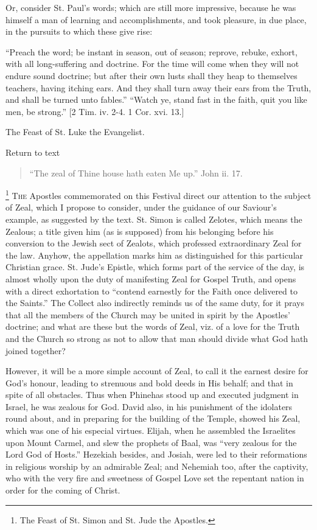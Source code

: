 Or, consider St. Paul's words; which are still more impressive,
because he was himself a man of learning and accomplishments, and took
pleasure, in due place, in the pursuits to which these give rise:

``Preach the word; be instant in season, out of season; reprove,
rebuke, exhort, with all long-suffering and doctrine. For the time will
come when they will not endure sound doctrine; but after their own lusts
shall they heap to themselves teachers, having itching ears. And they
shall turn away their ears from the Truth, and shall be turned unto
fables.'' ``Watch ye, stand fast in the faith, quit you like
men, be strong.'' [2 Tim. iv. 2-4. 1 Cor. xvi. 13.]


The Feast of St. Luke the Evangelist.

Return to text


\begin{quote}

``The zeal of Thine house hath eaten Me up.'' John ii. 17.

\end{quote}

\footnote{The Feast of St. Simon and St. Jude the Apostles.} T\textsc{he} Apostles
commemorated on this Festival direct our attention to the subject of
Zeal, which I propose to consider, under the guidance of our Saviour's
example, as suggested by the text. St. Simon is called Zelotes, which
means the Zealous; a title given him (as is supposed) from his belonging
before his conversion to the Jewish sect of Zealots, which professed
extraordinary Zeal for the law. Anyhow, the appellation marks him as
distinguished for this particular Christian grace. St. Jude's Epistle,
which forms part of the service of the day, is almost wholly upon the
duty of manifesting Zeal for Gospel Truth, and opens with a direct
exhortation to ``contend earnestly for the Faith once delivered to
the Saints.'' The Collect also indirectly reminds us of the same
duty, for it prays that all the members of the Church may be united in
spirit by the Apostles' doctrine; and what are these but the words of
Zeal, viz. of a love for the Truth and the Church so strong as not to
allow that man should divide what God hath joined together?

However, it will be a more simple account of Zeal, to call it the
earnest desire for God's honour, leading to strenuous and bold deeds in
His behalf; and that in spite of all obstacles. Thus when Phinehas stood
up and executed judgment in Israel, he was zealous for God. David also,
in his punishment of the idolaters round about, and in preparing for the
building of the Temple, showed his Zeal, which was one of his especial
virtues. Elijah, when he assembled the Israelites upon Mount Carmel, and
slew the prophets of Baal, was ``very zealous for the Lord God of
Hosts.'' Hezekiah besides, and Josiah, were led to their
reformations in religious worship by an admirable Zeal; and Nehemiah
too, after the captivity, who with the very fire and sweetness of Gospel
Love set the repentant nation in order for the coming of Christ.

